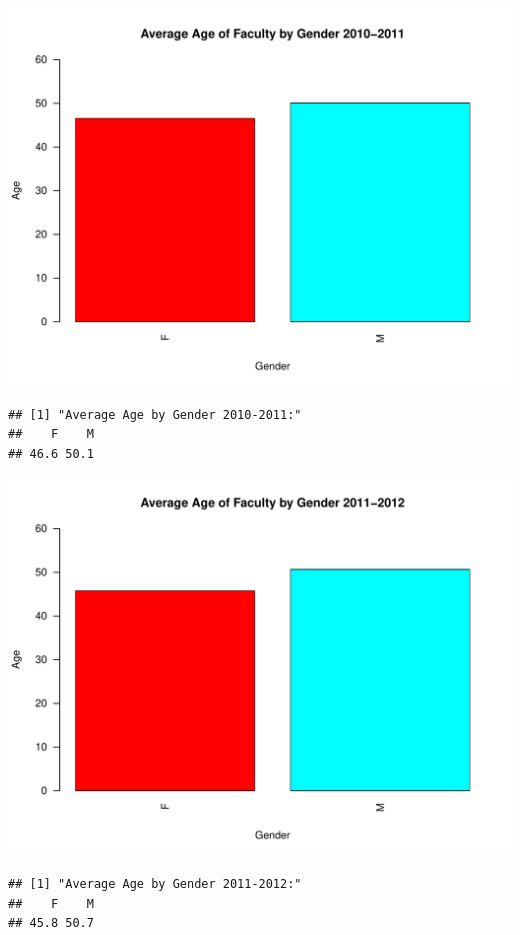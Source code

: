 \documentclass[12pt,a4paper]{article}\usepackage[]{graphicx}\usepackage[]{color}
\makeatletter
\def\maxwidth{ %
  \ifdim\Gin@nat@width>\linewidth
    \linewidth
  \else
    \Gin@nat@width
  \fi
}
\newenvironment{kframe}{%
 \def\at@end@of@kframe{}%
 \ifinner\ifhmode%
  \def\at@end@of@kframe{\end{minipage}}%
  \begin{minipage}{\columnwidth}%
 \fi\fi%
 \def\FrameCommand##1{\hskip\@totalleftmargin \hskip-\fboxsep
 \colorbox{shadecolor}{##1}\hskip-\fboxsep
     \hskip-\linewidth \hskip-\@totalleftmargin \hskip\columnwidth}%
 \MakeFramed {\advance\hsize-\width
   \@totalleftmargin\z@ \linewidth\hsize
   \@setminipage}}%
 {\par\unskip\endMakeFramed%
 \at@end@of@kframe}
\newenvironment{knitrout}{}{} %
\theoremstyle{definition}
\makeatother
\begin{document}
\begin{knitrout}
\includegraphics[width=\maxwidth]{figure/unnamed-chunk-10-7} 
\begin{kframe}\begin{verbatim}
## [1] "Average Age by Gender 2010-2011:"
##    F    M 
## 46.6 50.1
\end{verbatim}
\end{kframe}
\includegraphics[width=\maxwidth]{figure/unnamed-chunk-10-8} 
\begin{kframe}\begin{verbatim}
## [1] "Average Age by Gender 2011-2012:"
##    F    M 
## 45.8 50.7
\end{verbatim}
\end{kframe}

\end{knitrout}
\end{document}

